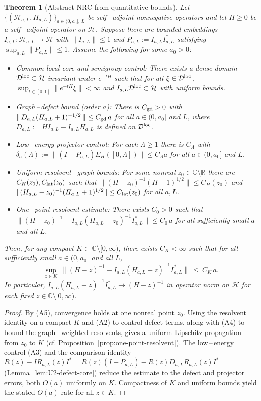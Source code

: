\documentclass[11pt]{amsart}
\theoremstyle{plain}
\newtheorem{theorem}{Theorem}[section]
\theoremstyle{definition}
\theoremstyle{remark}
\begin{document}
\begin{theorem}[Abstract NRC from quantitative bounds]\label{thm:abstract-nrc}
Let $\{(\mathcal H_{a,L},H_{a,L})\}_{a\in(0,a_0],\,L}$ be self\,--\,adjoint nonnegative operators and let $H\ge 0$ be a self\,--\,adjoint operator on $\mathcal H$. Suppose there are bounded embeddings $I_{a,L}:\mathcal H_{a,L}\to\mathcal H$ with $\|I_{a,L}\|\le 1$ and $P_{a,L}:=I_{a,L}I_{a,L}^*$ satisfying $\sup_{a,L}\|P_{a,L}\|\le 1$. Assume the following for some $a_0>0$:
\begin{itemize}
  \item[(A1)] Common local core and semigroup control: There exists a dense domain $\mathcal D^{\rm loc}\subset\mathcal H$ invariant under $e^{-tH}$ such that for all $\xi\in\mathcal D^{\rm loc}$, $\sup_{t\in[0,1]}\|e^{-tH}\xi\|<\infty$ and $I_{a,L}\mathcal D^{\rm loc}\subset \mathcal H$ with uniform bounds.
  \item[(A2)] Graph\,--\,defect bound (order $a$): There is $C_{\rm gd}>0$ with $\|\,D_{a,L}(H_{a,L}+1)^{-1/2}\,\|\le C_{\rm gd}\,a$ for all $a\in(0,a_0]$ and $L$, where $D_{a,L}:=H I_{a,L}-I_{a,L}H_{a,L}$ is defined on $\mathcal D^{\rm loc}$.
  \item[(A3)] Low\,--\,energy projector control: For each $\Lambda\ge 1$ there is $C_\Lambda$ with $\delta_a(\Lambda):=\|(I-P_{a,L})E_H([0,\Lambda])\|\le C_\Lambda a$ for all $a\in(0,a_0]$ and $L$.
  \item[(A4)] Uniform resolvent\,--\,graph bounds: For some nonreal $z_0\in\mathbb C\setminus\mathbb R$ there are $C_H(z_0),C_{\rm lat}(z_0)$ such that $\|(H-z_0)^{-1}(H+1)^{1/2}\|\le C_H(z_0)$ and $\|(H_{a,L}-z_0)^{-1}(H_{a,L}+1)^{1/2}\|\le C_{\rm lat}(z_0)$ for all $a,L$.
  \item[(A5)] One\,--\,point resolvent estimate: There exists $C_0>0$ such that $\big\|(H-z_0)^{-1}-I_{a,L}(H_{a,L}-z_0)^{-1}I_{a,L}^*\big\|\le C_0\,a$ for all sufficiently small $a$ and all $L$.
\end{itemize}
Then, for any compact $K\subset\mathbb C\setminus [0,\infty)$, there exists $C_K<\infty$ such that for all sufficiently small $a\in(0,a_0]$ and all $L$,
\[
  \sup_{z\in K}\ \big\|(H-z)^{-1}-I_{a,L}(H_{a,L}-z)^{-1}I_{a,L}^*\big\|\ \le\ C_K\,a.
\]
In particular, $I_{a,L}(H_{a,L}-z)^{-1}I_{a,L}^*\to (H-z)^{-1}$ in operator norm on $\mathcal H$ for each fixed $z\in\mathbb C\setminus[0,\infty)$.
\end{theorem}
\begin{proof}
By (A5), convergence holds at one nonreal point $z_0$. Using the resolvent identity on a compact $K$ and (A2) to control defect terms, along with (A4) to bound the graph\,--\,weighted resolvents, gives a uniform Lipschitz propagation from $z_0$ to $K$ (cf. Proposition~\ref{prop:one-point-resolvent}). The low\,--\,energy control (A3) and the comparison identity $R(z)-I R_{a,L}(z)I^*=R(z)(I-P_{a,L})-R(z)D_{a,L}R_{a,L}(z)I^*$ (Lemma~\ref{lem:U2-defect-core}) reduce the estimate to the defect and projector errors, both $O(a)$ uniformly on $K$. Compactness of $K$ and uniform bounds yield the stated $O(a)$ rate for all $z\in K$.
\end{proof}
\end{document}
